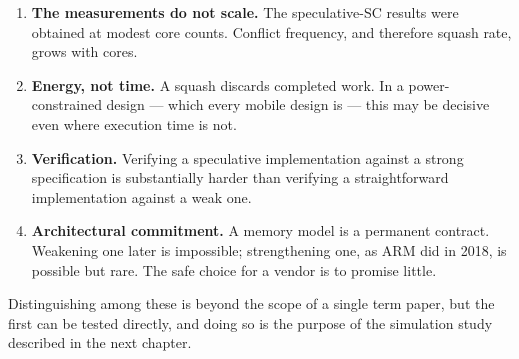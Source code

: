 \begin{enumerate}
\item \textbf{The measurements do not scale.} The speculative-SC results were
  obtained at modest core counts.
Conflict frequency, and therefore squash rate,
  grows with cores.
\item \textbf{Energy, not time.} A squash discards completed work. In a
  power-constrained design --- which every mobile design is --- this may be
  decisive even where execution time is not.
\item \textbf{Verification.} Verifying a speculative implementation against a
  strong specification is substantially harder than verifying a straightforward
  implementation against a weak one.
\item \textbf{Architectural commitment.} A memory model is a permanent contract.
  Weakening one later is impossible; strengthening one, as ARM did in 2018, is
  possible but rare.
The safe choice for a vendor is to promise little.
\end{enumerate}

Distinguishing among these is beyond the scope of a single term paper, but the
first can be tested directly, and doing so is the purpose of the simulation study
described in the next chapter.
